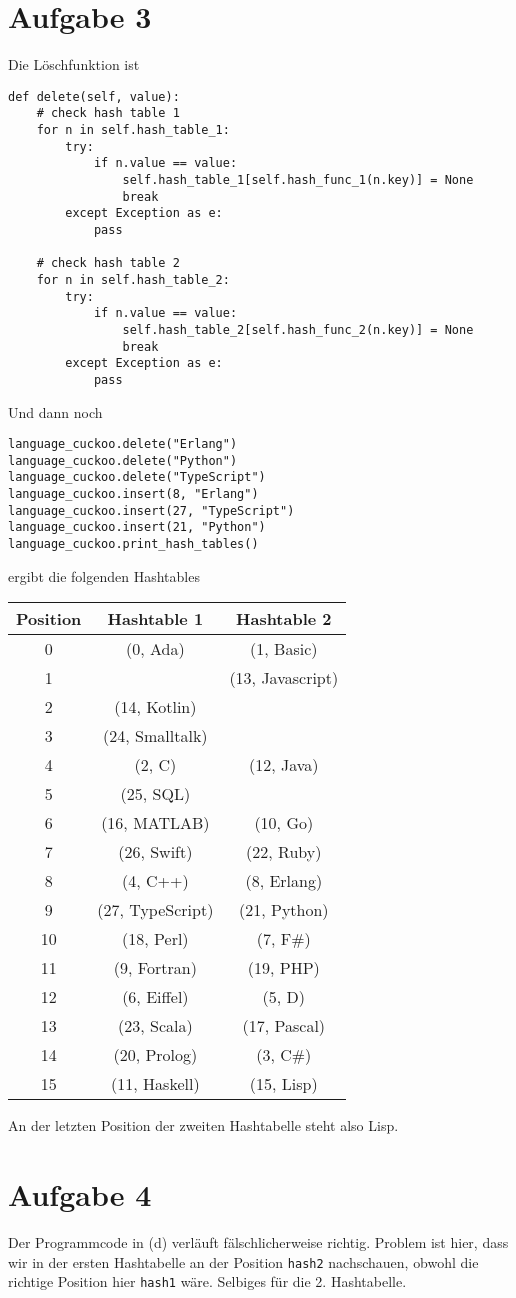 \documentclass{article}
\begin{document}
	\section*{Aufgabe 3}
	Die Löschfunktion ist
	\begin{lstlisting}[style=python, tabsize=2]
def delete(self, value):
	# check hash table 1
	for n in self.hash_table_1:
		try:
			if n.value == value:
				self.hash_table_1[self.hash_func_1(n.key)] = None
				break
		except Exception as e:
			pass

	# check hash table 2
	for n in self.hash_table_2:
		try:
			if n.value == value:
				self.hash_table_2[self.hash_func_2(n.key)] = None
				break
		except Exception as e:
			pass
	\end{lstlisting}
	Und dann noch
	\begin{lstlisting}[style=python,tabsize=2]
language_cuckoo.delete("Erlang")
language_cuckoo.delete("Python")
language_cuckoo.delete("TypeScript")
language_cuckoo.insert(8, "Erlang")
language_cuckoo.insert(27, "TypeScript")
language_cuckoo.insert(21, "Python")
language_cuckoo.print_hash_tables()
	\end{lstlisting}
	ergibt die folgenden Hashtables
	\begin{center}
		\begin{tabular}{c|c|c}
			\textbf{Position} & \textbf{Hashtable 1} & \textbf{Hashtable 2} \\
			\hline
			0 & (0, Ada) & (1, Basic) \\
			1 & & (13, Javascript) \\
			2 & (14, Kotlin) & \\
			3 & (24, Smalltalk) & \\
			4 & (2, C) & (12, Java) \\
			5 & (25, SQL) & \\
			6 & (16, MATLAB) & (10, Go)  \\
			7 & (26, Swift) & (22, Ruby) \\
			8 & (4, C++) & (8, Erlang) \\
			9 & (27, TypeScript) & (21, Python) \\
			10 & (18, Perl) & (7, F\#) \\
			11 & (9, Fortran) & (19, PHP) \\
			12 & (6, Eiffel) & (5, D) \\
			13 & (23, Scala) & (17, Pascal) \\
			14 & (20, Prolog) & (3, C\#) \\
			15 & (11, Haskell) & (15, Lisp)
		\end{tabular}
	\end{center}
	An der letzten Position der zweiten Hashtabelle steht also Lisp.
	
	\section*{Aufgabe 4}
	Der Programmcode in (d) verläuft fälschlicherweise richtig. Problem ist hier, dass wir in der ersten Hashtabelle an der Position \texttt{hash2} nachschauen, obwohl die richtige Position hier \texttt{hash1} wäre. Selbiges für die 2. Hashtabelle.
\end{document}
